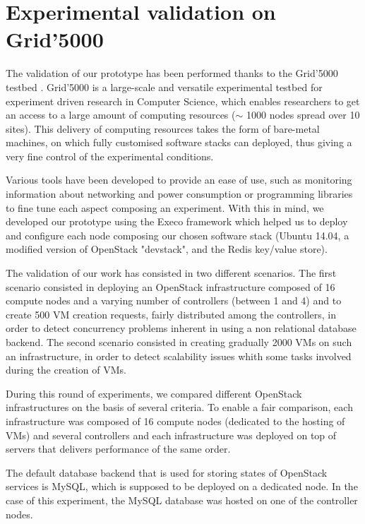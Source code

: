 \section{Experimental validation on Grid'5000}
\label{sec:eval}

The validation of our prototype has been performed thanks to the Grid'5000
testbed \cite{grid5000}. Grid'5000 is a large-scale and versatile experimental
testbed for experiment driven research in Computer Science, which enables
researchers to get an access to a large amount of computing resources
($\sim$ 1000 nodes spread over 10 sites). This delivery of computing resources
takes the form of bare-metal machines, on which fully customised software stacks
can deployed, thus giving a very fine control of the experimental conditions.

Various tools have been developed to provide an ease of use, such as monitoring
information about networking and power consumption or programming libraries to
fine tune each aspect composing an experiment. With this in mind, we developed
our prototype using the Execo framework \cite{imbert:hal-00861886} which helped
us to deploy and configure each node composing our chosen software stack (Ubuntu
14.04, a modified version of OpenStack "devstack", and the Redis key/value store).

The validation of our work has consisted in two different scenarios. The first
scenario consisted in deploying an OpenStack infrastructure composed of 16 compute
nodes and a varying number of controllers (between 1 and 4) and to create 500 VM
creation requests, fairly distributed among the controllers, in order to detect
concurrency problems inherent in using a non relational database backend. The
second scenario consisted in creating gradually 2000 VMs on such an
infrastructure, in order to detect scalability issues whith some tasks involved
during the creation of VMs.

During this round of experiments, we compared different OpenStack
infrastructures on the basis of several criteria. To enable a fair comparison,
each infrastructure was composed of 16 compute nodes (dedicated
to the hosting of VMs) and several controllers and each infrastructure was
deployed on top of servers that delivers performance of the same order.

The default database backend that is used for storing states of OpenStack
services is MySQL, which is supposed to be deployed on a dedicated node. In the
case of this experiment, the MySQL database was hosted on one of the controller
nodes.

